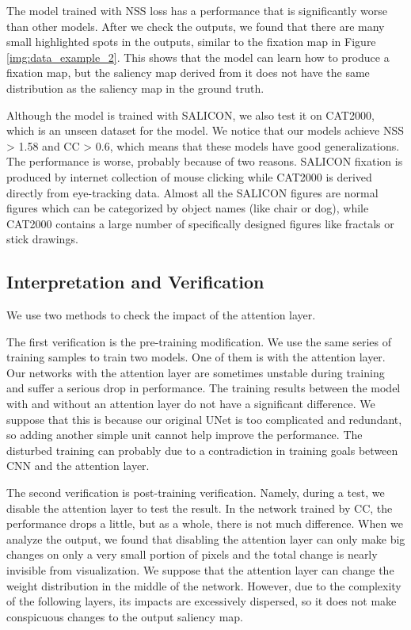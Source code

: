 \documentclass[12pt]{article}
\begin{document}
The model trained with NSS loss has a performance that is significantly worse than other models.
After we check the outputs, we found that there are many small highlighted spots in the outputs, similar to the fixation map in Figure \ref{img:data_example_2}.
This shows that the model can learn how to produce a fixation map, but the saliency map derived from it does not have the same distribution as the saliency map in the ground truth.

Although the model is trained with SALICON, we also test it on CAT2000, which is an unseen dataset for the model.
We notice that our models achieve NSS > 1.58 and CC > 0.6, which means that these models have good generalizations.
The performance is worse, probably because of two reasons.
SALICON fixation is produced by internet collection of mouse clicking while CAT2000 is derived directly from eye-tracking data.
Almost all the SALICON figures are normal figures which can be categorized by object names (like chair or dog), while CAT2000 contains a large number of specifically designed figures like fractals or stick drawings.


\subsection{Interpretation and Verification}

We use two methods to check the impact of the attention layer.

The first verification is the pre-training modification. We use the same series of training samples to train two models. One of them is with the attention layer. Our networks with the attention layer are sometimes unstable during training and suffer a serious drop in performance.
The training results between the model with and without an attention layer do not have a significant difference.
We suppose that this is because our original UNet is too complicated and redundant, so adding another simple unit cannot help improve the performance. The disturbed training can probably due to a contradiction in training goals between CNN and the attention layer.

The second verification is post-training verification. Namely, during a test, we disable the attention layer to test the result. In the network trained by CC, the performance drops a little, but as a whole, there is not much difference.
When we analyze the output, we found that disabling the attention layer can only make big changes on only a very small portion of pixels and the total change is nearly invisible from visualization.
We suppose that the attention layer can change the weight distribution in the middle of the network. However, due to the complexity of the following layers, its impacts are excessively dispersed, so it does not make conspicuous changes to the output saliency map.
\end{document}
